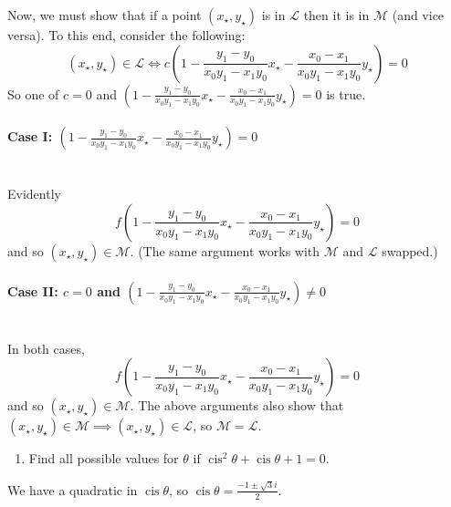 \documentclass[a4paper,10pt]{article}
\DeclareMathOperator{\cis}{cis}
\newcommand{\answer}{\bfseries\color{Emerald}\refstepcounter{enumi}\item[\theenumi.]}
\begin{document}
Now, we must show that if a point $ (x_\star, y_\star) $ is in $ \mathcal{L} $ then it is in $ \mathcal{M} $ (and vice versa).
To this end, consider the following:
\begin{displaymath}
  (x_\star, y_\star) \in \mathcal{L} \iff c \left(1 - \frac{y_1 - y_0}{x_0 y_1 - x_1 y_0} x_\star - \frac{x_0 - x_1}{x_0 y_1 - x_1 y_0} y_\star \right) = 0
\end{displaymath}
So one of $ c = 0 $ and $ \left(1 - \frac{y_1 - y_0}{x_0 y_1 - x_1 y_0} x_\star - \frac{x_0 - x_1}{x_0 y_1 - x_1 y_0} y_\star \right) = 0 $ is true.

\paragraph{Case I: $ \left(1 - \frac{y_1 - y_0}{x_0 y_1 - x_1 y_0} x_\star - \frac{x_0 - x_1}{x_0 y_1 - x_1 y_0} y_\star \right) = 0 $}\mbox{}\\
Evidently
\begin{displaymath}
  f \left(1 - \frac{y_1 - y_0}{x_0 y_1 - x_1 y_0} x_\star - \frac{x_0 - x_1}{x_0 y_1 - x_1 y_0} y_\star \right) = 0
\end{displaymath}
and so $ (x_\star, y_\star) \in \mathcal{M} $. (The same argument works with $ \mathcal{M} $ and $ \mathcal{L} $ swapped.)

\paragraph{Case II: $ c = 0 $ and $ \left(1 - \frac{y_1 - y_0}{x_0 y_1 - x_1 y_0} x_\star - \frac{x_0 - x_1}{x_0 y_1 - x_1 y_0} y_\star \right) \neq 0 $}\mbox{}\\
In both cases,
\begin{displaymath}
  f \left(1 - \frac{y_1 - y_0}{x_0 y_1 - x_1 y_0} x_\star - \frac{x_0 - x_1}{x_0 y_1 - x_1 y_0} y_\star \right) = 0
\end{displaymath}
and so $ (x_\star, y_\star) \in \mathcal{M} $. The above arguments also show that $ (x_\star, y_\star) \in \mathcal{M} \implies (x_\star, y_\star) \in \mathcal{L} $,
so $ \mathcal{M} = \mathcal{L} $.

\filbreak\begin{enumerate}[resume]
  \answer Find all possible values for $ \theta $ if $ \cis^2 \theta + \cis \theta + 1 = 0 $.
\end{enumerate}

We have a quadratic in $ \cis \theta $, so $ \cis \theta = \frac{-1\pm\sqrt{3}i}{2} $.
\end{document}
